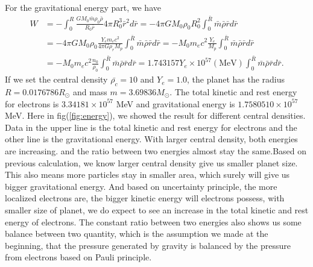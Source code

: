 \documentclass{article}
\begin{document}
For the gravitational energy part, we have
\begin{equation}
\begin{aligned}
W&=-\int_0^R\frac{GM_0 \bar{m}\rho_0 \bar{\rho}}{R_0 \bar{r}} 4\pi R_0^3 \bar{r}^2 d\bar{r}
=-4\pi GM_0\rho_0 R_0^2 \int_0^{\bar{R}} \bar{m}\bar{\rho}\bar{r}d\bar{r}\\
&=-4\pi GM_0\rho_0 \frac{Y_e m_e c^2}{4 \pi G \rho_r M_p} \int_0^{\bar{R}} \bar{m}\bar{\rho}\bar{r}d\bar{r}
=-M_0 m_ec^2 \frac{Y_e}{M_p}\int_0^{\bar{R}} \bar{m}\bar{\rho}\bar{r}d\bar{r}\\
&=-M_0 m_ec^2 \frac{n_0}{\rho_0}\int_0^{\bar{R}} \bar{m}\bar{\rho}\bar{r}d\bar{r}
=1.743157 Y_e \times 10^{57} (\text{MeV}) \int_0^{\bar{R}} \bar{m}\bar{\rho}\bar{r}d\bar{r}.
\end{aligned}
\end{equation}
If we set the central density $\bar{\rho_c}=10$ and $Y_e=1.0$, the planet has the radius $R= 0.0176786 R_{\odot}$ and mass $m= 3.69836 M_{\odot}$. The total kinetic and rest energy for electrons is $3.34181 \times 10^{57}$ MeV and gravitational energy is $1.7580510 \times 10^{57}$MeV. Here in fig(\ref{fig:energy}), we showed the result for different central densities. Data in the upper line is the total kinetic and rest energy for electrons and the other line is the gravitational energy. With larger central density, both energies are increasing. and the ratio between two energies almost stay the same.Based on previous calculation, we know larger central density give us smaller planet size. This also means more particles stay in smaller area, which surely will give us bigger gravitational energy. And based on uncertainty principle, the more localized electrons are, the bigger kinetic energy will electrons possess, with smaller size of planet, we do expect to see an increase in the total kinetic and rest energy of electrons. The constant ratio between two energies also shows us some balance between two quantity, which is the assumption we made at the beginning,  that the pressure generated by gravity is balanced by the pressure from electrons based on Pauli principle. 
\end{document}
